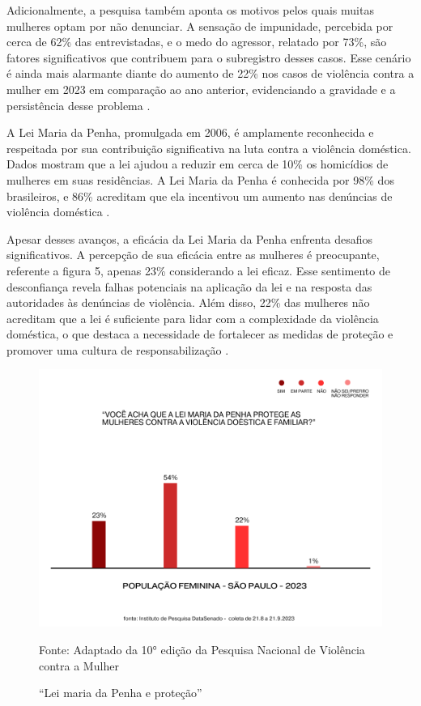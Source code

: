 \documentclass[
    article,			%
    12pt,				%
    oneside,            %
    a4paper,			%
    english,			%
    brazil,				%
    ]{abntex2}
\begin{document}
    Adicionalmente, a pesquisa também aponta os motivos pelos quais muitas mulheres optam por não denunciar. A sensação de impunidade, percebida por cerca de 62\% das entrevistadas, e o medo do agressor, relatado por 73\%, são fatores significativos que contribuem para o subregistro desses casos. Esse cenário é ainda mais alarmante diante do aumento de 22\% nos casos de violência contra a mulher em 2023 em comparação ao ano anterior, evidenciando a gravidade e a persistência desse problema \cite{senadoSP_2023}.

    A Lei Maria da Penha, promulgada em 2006, é amplamente reconhecida e respeitada por sua contribuição significativa na luta contra a violência doméstica. Dados mostram que a lei ajudou a reduzir em cerca de 10\% os homicídios de mulheres em suas residências. A Lei Maria da Penha é conhecida por 98\% dos brasileiros, e 86\% acreditam que ela incentivou um aumento nas denúncias de violência doméstica \cite{lei-covid}.

    Apesar desses avanços, a eficácia da Lei Maria da Penha enfrenta desafios significativos. A percepção de sua eficácia entre as mulheres é preocupante, referente a figura 5, apenas 23\% considerando a lei eficaz. Esse sentimento de desconfiança revela falhas potenciais na aplicação da lei e na resposta das autoridades às denúncias de violência. Além disso, 22\% das mulheres não acreditam que a lei é suficiente para lidar com a complexidade da violência doméstica, o que destaca a necessidade de fortalecer as medidas de proteção e promover uma cultura de responsabilização \cite{senadoSP_2023}.

\begin{figure}[ht]
    \centering

    \includegraphics[width=12cm]{lei maria da penha protege.png}\\
    \caption{“Lei maria da Penha e proteção”}
        Fonte: Adaptado da 10° edição da Pesquisa Nacional de Violência contra a Mulher
    \label{fig:infografico}
\end{figure}
\end{document}
